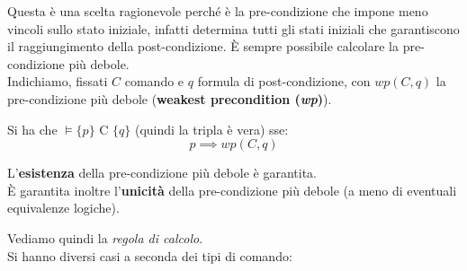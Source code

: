 				      				Questa è una scelta ragionevole perché è la pre-condizione che impone meno
				      				vincoli sullo stato iniziale, infatti determina tutti gli stati iniziali che
				      				garantiscono il raggiungimento della post-condizione. È sempre possibile
				      				calcolare la pre-condizione più debole.\\
				      				Indichiamo, fissati $C$ comando e $q$ formula di post-condizione, con $wp(C, q)$
				      				la pre-condizione più debole (\textbf{weakest precondition (\textit{wp})}).
				      				\begin{teorema}
				      					Si ha che $\vDash\{p\}\mbox{ C }\{q\}$ (quindi la tripla è vera) sse:
				      					\[p\implies wp(C,q)\]
				      				\end{teorema}
				      				\begin{teorema}
				      					L'\textbf{esistenza} della pre-condizione più debole è garantita.\\
				      					È garantita inoltre l'\textbf{unicità} della pre-condizione più debole (a meno
				      					di eventuali equivalenze logiche).
				      				\end{teorema}
				      				Vediamo quindi la \textit{regola di calcolo}.\\
				      				Si hanno diversi casi a seconda dei tipi di comando:
